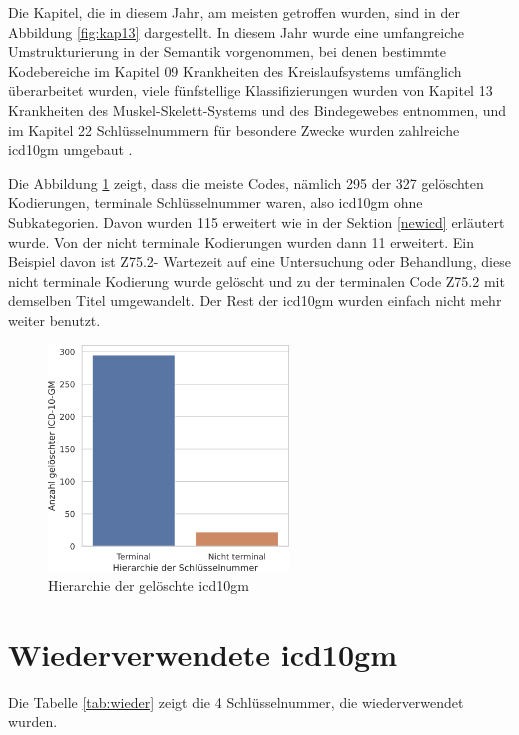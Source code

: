 Die Kapitel, die in diesem Jahr, am meisten getroffen wurden, sind in der Abbildung \ref{fig:kap13} dargestellt. In diesem Jahr wurde eine umfangreiche Umstrukturierung in der Semantik vorgenommen, bei denen bestimmte Kodebereiche im Kapitel \textsf{09} \textsf{Krankheiten des Kreislaufsystems} umfänglich überarbeitet wurden, viele fünfstellige Klassifizierungen wurden von Kapitel \textsf{13} \textsf{Krankheiten des Muskel-Skelett-Systems und des Bindegewebes} entnommen, und im Kapitel \textsf{22} \textsf{Schlüsselnummern für besondere Zwecke} wurden zahlreiche \ac{icd10gm} umgebaut \cite{dele13}.

Die Abbildung \ref{fig:oldicdort} zeigt, dass die meiste Codes, nämlich \textsf{295} der \textsf{327} gelöschten Kodierungen, terminale Schlüsselnummer waren, also \ac{icd10gm} ohne Subkategorien. Davon wurden \textsf{115} erweitert wie in der Sektion \ref{newicd} erläutert wurde. Von der nicht terminale Kodierungen wurden dann \textsf{11} erweitert. Ein Beispiel davon ist \textsf{Z75.2-} \textsf{Wartezeit auf eine Untersuchung oder Behandlung}, diese nicht terminale Kodierung wurde gelöscht und zu der terminalen Code \textsf{Z75.2} mit demselben Titel umgewandelt. Der Rest der \ac{icd10gm} wurden einfach nicht mehr weiter benutzt. 


\begin{figure}[ht]
	\centering
	\includegraphics[height=6cm]{figures/ortoldYear}
	\caption{Hierarchie der gelöschte \acs{icd10gm}}
	\label{fig:oldicdort}
\end{figure}


\section{Wiederverwendete \acs{icd10gm}}

Die Tabelle \ref{tab:wieder} zeigt die \textsf{4} Schlüsselnummer, die wiederverwendet wurden.

